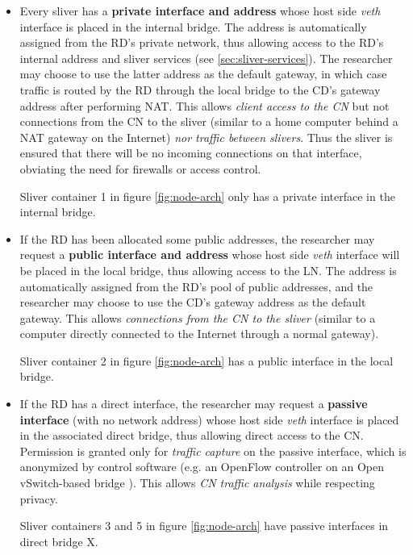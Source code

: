\documentclass[conference]{IEEEtran}
\begin{document}
\begin{itemize}
\item Every sliver has a \textbf{private interface and address} whose host
  side \emph{veth} interface is placed in the internal bridge.  The address is
  automatically assigned from the RD's private network, thus allowing access
  to the RD's internal address and sliver services (see
  \ref{sec:sliver-services}).  The researcher may choose to use the latter
  address as the default gateway, in which case traffic is routed by the RD
  through the local bridge to the CD's gateway address after performing NAT.
  This allows \emph{client access to the CN} but not connections from the CN
  to the sliver (similar to a home computer behind a NAT gateway on the
  Internet) \emph{nor traffic between slivers}.  Thus the sliver is ensured
  that there will be no incoming connections on that interface, obviating the
  need for firewalls or access control.

  Sliver container 1 in figure \ref{fig:node-arch} only has a private
  interface in the internal bridge.

\item If the RD has been allocated some public addresses, the researcher may
  request a \textbf{public interface and address} whose host side \emph{veth}
  interface will be placed in the local bridge, thus allowing access to the
  LN.  The address is automatically assigned from the RD's pool of public addresses, and
  the researcher may choose to use the CD's gateway address as the default
  gateway.  This allows \emph{connections from the CN to the sliver} (similar
  to a computer directly connected to the Internet through a normal gateway).

  Sliver container 2 in figure \ref{fig:node-arch} has a public interface in
  the local bridge.

\item If the RD has a direct interface, the researcher may request a
  \textbf{passive interface} (with no network address) whose host side \emph{veth}
  interface is placed in the associated direct bridge, thus allowing direct
  access to the CN.  Permission is granted only for \emph{traffic capture} on
  the passive interface, which is anonymized by control software (e.g. an
  OpenFlow controller%
  on an Open vSwitch-based bridge
  \cite{open-vswitch}).  This allows \emph{CN traffic analysis} while
  respecting privacy.

  Sliver containers 3 and 5 in figure \ref{fig:node-arch} have passive
  interfaces in direct bridge X.


\end{itemize}
\end{document}
